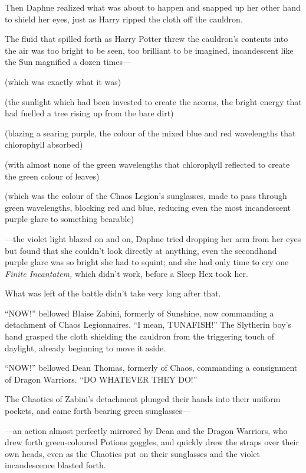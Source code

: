 Then Daphne realized what was about to happen and snapped up her other hand to shield her eyes, just as Harry ripped the cloth off the cauldron.

The fluid that spilled forth as Harry Potter threw the cauldron’s contents into the air was too bright to be seen, too brilliant to be imagined, incandescent like the Sun magnified a dozen times—

(which was exactly what it was)

(the sunlight which had been invested to create the acorns, the bright energy that had fuelled a tree rising up from the bare dirt)

(blazing a searing purple, the colour of the mixed blue and red wavelengths that chlorophyll absorbed)

(with almost none of the green wavelengths that chlorophyll reflected to create the green colour of leaves)

(which was the colour of the Chaos Legion’s sunglasses, made to pass through green wavelengths, blocking red and blue, reducing even the most incandescent purple glare to something bearable)

—the violet light blazed on and on, Daphne tried dropping her arm from her eyes but found that she couldn’t look directly at anything, even the secondhand purple glare was so bright she had to squint; and she had only time to cry one \emph{Finite Incantatem,} which didn’t work, before a Sleep Hex took her.

What was left of the battle didn’t take very long after that.

\later

“NOW!” bellowed Blaise Zabini, formerly of Sunshine, now commanding a detachment of Chaos Legionnaires. “I mean, TUNAFISH!” The Slytherin boy’s hand grasped the cloth shielding the cauldron from the triggering touch of daylight, already beginning to move it aside.

“NOW!” bellowed Dean Thomas, formerly of Chaos, commanding a consignment of Dragon Warriors. “DO WHATEVER THEY DO!”

The Chaotics of Zabini’s detachment plunged their hands into their uniform pockets, and came forth bearing green sunglasses—

—an action almost perfectly mirrored by Dean and the Dragon Warriors, who drew forth green-coloured Potions goggles, and quickly drew the straps over their own heads, even as the Chaotics put on their sunglasses and the violet incandescence blasted forth.

